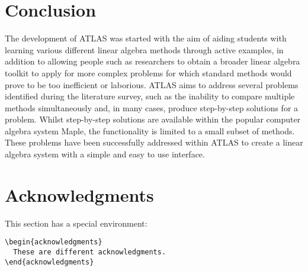 \documentclass[
]{ceurart}
\begin{document}



\section{Conclusion}
The development of ATLAS was started with the aim of aiding students with learning various different linear algebra methods through active examples, in addition to allowing people such as researchers to obtain a broader linear algebra toolkit to apply for more complex problems for which standard methods would prove to be too inefficient or laborious. ATLAS aims to address several problems identified during the literature survey, such as the inability to compare multiple methods simultaneously and, in many cases, produce step-by-step solutions for a problem. Whilst step-by-step solutions are available within the popular computer algebra system Maple, the functionality is limited to a small subset of methods. These problems have been successfully addressed within ATLAS to create a linear algebra system with a simple and easy to use interface.

\section{Acknowledgments}


This section has a special environment:
\begin{verbatim}
\begin{acknowledgments}
  These are different acknowledgments.
\end{acknowledgments}
\end{verbatim}

\end{document}
